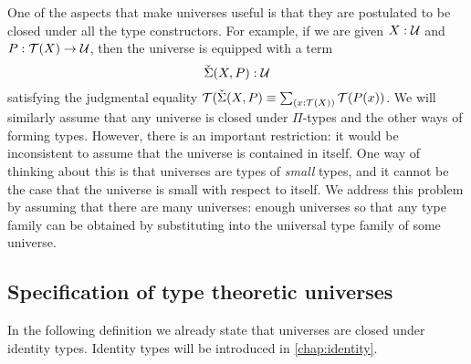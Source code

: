 One of the aspects that make universes useful is that they are postulated to be closed under all the type constructors. For example, if we are given $X:\mathcal{U}$ and $P:\mathcal{T}(X)\to \mathcal{U}$, then the universe is equipped with a term
\begin{equation*}
  \check{\Sigma}(X,P):\mathcal{U}
\end{equation*}
satisfying the judgmental equality $\Ty(\check{\Sigma}(X,P)\jdeq\sm{x:\Ty(X)}\Ty(P(x))$. We will similarly assume that any universe is closed under $\Pi$-types and the other ways of forming types. However, there is an important restriction: it would be inconsistent to assume that the universe is contained in itself. One way of thinking about this is that universes are types of \emph{small} types, and it cannot be the case that the universe is small with respect to itself. We address this problem by assuming that there are many universes: enough universes so that any type family can be obtained by substituting into the universal type family of some universe.

\subsection{Specification of type theoretic universes}

In the following definition we already state that universes are closed under identity types. Identity types will be introduced in \cref{chap:identity}.


